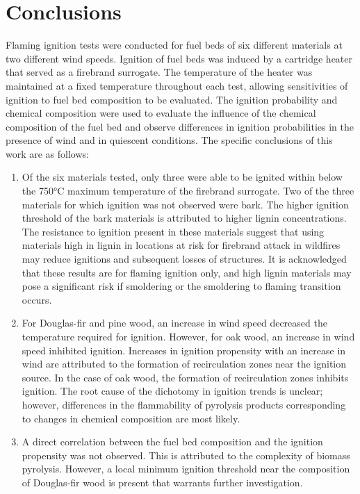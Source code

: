 \section{Conclusions}
\label{sec:conclusions3}    
    Flaming ignition tests were conducted for fuel beds of six different materials at two different wind speeds. Ignition of fuel beds was induced by a cartridge heater that served as a firebrand surrogate. The temperature of the heater was maintained at a fixed temperature throughout each test, allowing sensitivities of ignition to fuel bed composition to be evaluated. The ignition probability and chemical composition were used to evaluate the influence of the chemical composition of the fuel bed and observe differences in ignition probabilities in the presence of wind and in quiescent conditions. The specific conclusions of this work are as follows:
        \begin{enumerate}
            \item Of the six materials tested, only three were able to be ignited within below the 750\si{\celsius} maximum temperature of the firebrand surrogate. Two of the three materials for which ignition was not observed were bark. The higher ignition threshold of the bark materials is attributed to higher lignin concentrations. The resistance to ignition present in these materials suggest that using materials high in lignin in locations at risk for firebrand attack in wildfires may reduce ignitions and subsequent losses of structures. It is acknowledged that these results are for flaming ignition only, and high lignin materials may pose a significant risk if smoldering or the smoldering to flaming transition occurs.
            
            \item For Douglas-fir and pine wood, an increase in wind speed decreased the temperature required for ignition. However, for oak wood, an increase in wind speed inhibited ignition. Increases in ignition propensity with an increase in wind are attributed to the formation of recirculation zones near the ignition source. In the case of oak wood, the formation of recirculation zones inhibits ignition. The root cause of the dichotomy in ignition trends is unclear; however, differences in the flammability of pyrolysis products corresponding to changes in chemical composition are most likely.
            
            \item A direct correlation between the fuel bed composition and the ignition propensity was not observed. This is attributed to the complexity of biomass pyrolysis. However, a local minimum ignition threshold near the composition of Douglas-fir wood is present that warrants further investigation. 
        \end{enumerate}

